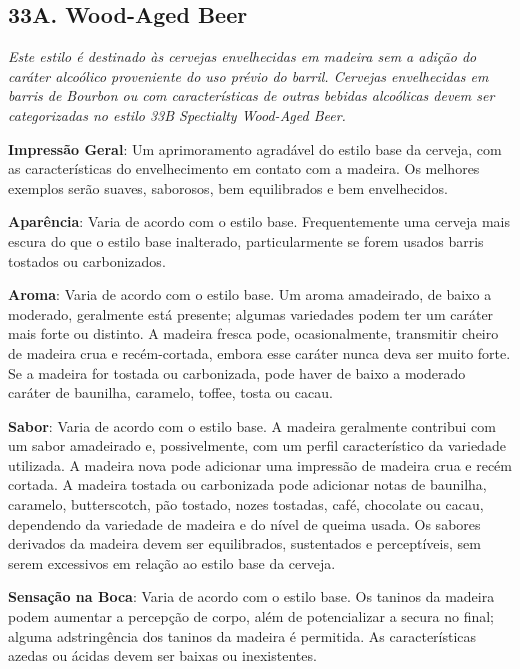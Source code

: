 \subsection*{33A. Wood-Aged Beer}

\textit{Este estilo é destinado às cervejas envelhecidas em madeira sem a adição do caráter alcoólico proveniente do uso prévio do barril. Cervejas envelhecidas em barris de Bourbon ou com características de outras bebidas alcoólicas devem ser categorizadas no estilo 33B Spectialty Wood-Aged Beer.}

\textbf{Impressão Geral}: Um aprimoramento agradável do estilo base da cerveja, com as características do envelhecimento em contato com a madeira. Os melhores exemplos serão suaves, saborosos, bem equilibrados e bem envelhecidos.

\textbf{Aparência}: Varia de acordo com o estilo base. Frequentemente uma cerveja mais escura do que o estilo base inalterado, particularmente se forem usados barris tostados ou carbonizados.

\textbf{Aroma}: Varia de acordo com o estilo base. Um aroma amadeirado, de baixo a moderado, geralmente está presente; algumas variedades podem ter um caráter mais forte ou distinto. A madeira fresca pode, ocasionalmente, transmitir cheiro de madeira crua e recém-cortada, embora esse caráter nunca deva ser muito forte. Se a madeira for tostada ou carbonizada, pode haver de baixo a moderado caráter de baunilha, caramelo, toffee, tosta ou cacau.

\textbf{Sabor}: Varia de acordo com o estilo base. A madeira geralmente contribui com um sabor amadeirado e, possivelmente, com um perfil característico da variedade utilizada. A madeira nova pode adicionar uma impressão de madeira crua e recém cortada. A madeira tostada ou carbonizada pode adicionar notas de baunilha, caramelo, butterscotch, pão tostado, nozes tostadas, café, chocolate ou cacau, dependendo da variedade de madeira e do nível de queima usada. Os sabores derivados da madeira devem ser equilibrados, sustentados e perceptíveis, sem serem excessivos em relação ao estilo base da cerveja.

\textbf{Sensação na Boca}: Varia de acordo com o estilo base. Os taninos da madeira podem aumentar a percepção de corpo, além de potencializar a secura no final; alguma adstringência dos taninos da madeira é permitida. As características azedas ou ácidas devem ser baixas ou inexistentes.

